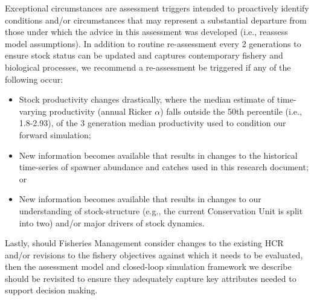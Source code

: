 \documentclass[11pt]{book}
\begin{document}
Exceptional circumstances are assessment triggers intended to proactively identify conditions and/or circumstances that may represent a substantial departure from those under which the advice in this assessment was developed (i.e., reassess model assumptions). In addition to routine re-assessment every 2 generations to ensure stock status can be updated and captures contemporary fishery and biological processes, we recommend a re-assessment be triggered if any of the following occur:
\begin{itemize}
\item
  Stock productivity changes drastically, where the median estimate of time-varying productivity (annual Ricker \(\alpha\)) falls outside the 50th percentile (i.e., 1.8-2.93), of the 3 generation median productivity used to condition our forward simulation;
\item
  New information becomes available that results in changes to the historical time-series of spawner abundance and catches used in this research document; or
\item
  New information becomes available that results in changes to our understanding of stock-structure (e.g., the current Conservation Unit is split into two) and/or major drivers of stock dynamics.
\end{itemize}
Lastly, should Fisheries Management consider changes to the existing HCR and/or revisions to the fishery objectives against which it needs to be evaluated, then the assessment model and closed-loop simulation framework we describe should be revisited to ensure they adequately capture key attributes needed to support decision making.
\end{document}
